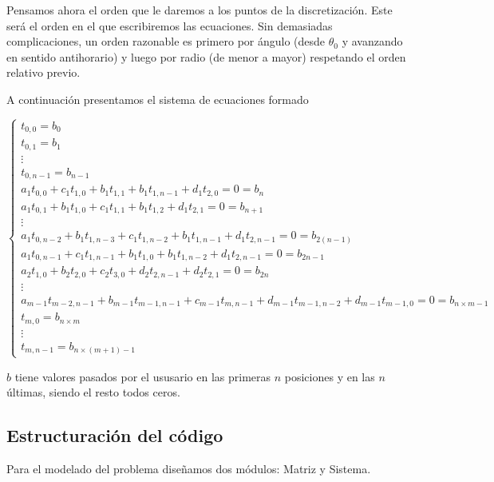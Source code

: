 Pensamos ahora el orden que le daremos a los puntos de la discretización. Este será el orden en el que escribiremos las ecuaciones. Sin demasiadas complicaciones, un orden razonable es primero por ángulo (desde $\theta_0$ y avanzando en sentido antihorario) y luego por radio (de menor a mayor) respetando el orden relativo previo.

A continuación presentamos el sistema de ecuaciones formado 

\begin{equation}
\label{sisecu}
  \left\lbrace
  \begin{array}{l}
     t_{0,0} = b_0 \\
     t_{0,1} = b_1 \\
     \vdots\\
     t_{0,n-1} = b_{n-1} \\
		 a_1 t_{0,0} + c_1 t_{1,0} + b_1 t_{1, 1} + b_1 t_{1, n-1} + d_1 t_{2, 0} = 0 = b_{n}\\
		 a_1 t_{0,1} + b_1 t_{1, 0} + c_1 t_{1,1} + b_1 t_{1,2} + d_1 t_{2,1} = 0 = b_{n+1} \\
		 \vdots\\
		 a_1 t_{0,n-2} + b_1 t_{1, n-3} + c_1 t_{1,n-2} + b_1 t_{1,n-1} + d_1 t_{2,n-1} = 0 = b_{2(n-1)} \\
		 a_1 t_{0,n-1} + c_1 t_{1,n-1} + b_1 t_{1, 0} + b_1 t_{1, n-2} + d_1 t_{2, n-1} = 0= b_{2n - 1}\\
		 a_2 t_{1,0} + b_2 t_{2,0} + c_2 t_{3, 0} + d_2 t_{2, n-1} + d_2 t_{2, 1} = 0 = b_{2n}\\
		 \vdots\\
		 a_{m-1} t_{m-2,n-1} + b_{m-1} t_{m-1,n-1} + c_{m-1} t_{m, n-1} + d_{m-1} t_{m-1, n-2} + d_{m-1} t_{m-1, 0} = 0 = b_{n\times m -1}\\
		 t_{m,0} = b_{n\times m}\\
		 \vdots\\
		 t_{m, n-1} = b_{n\times (m+1)-1}
		 
  \end{array}
  \right.
\end{equation}

$b$ tiene valores pasados por el ususario en las primeras $n$ posiciones y en las $n$ últimas, siendo el resto todos ceros.




\subsection{Estructuración del código}
Para el modelado del problema diseñamos dos módulos: Matriz y Sistema. 

